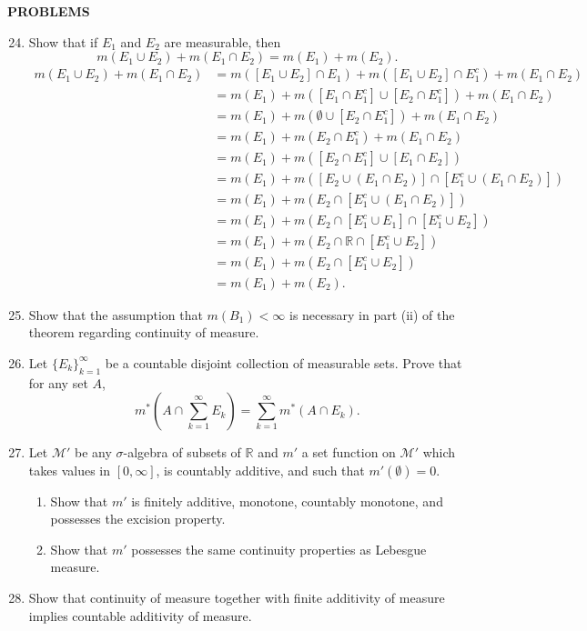 \begin{center}
	\textbf{PROBLEMS}
\end{center}
\begin{enumerate}
	\setcounter{enumi}{23}
	\item Show that if $E_1$ and $E_2$ are measurable, then
	\[
		m(E_1\cup E_2)+m(E_1\cap E_2) = m(E_1)+m(E_2).	
	\]
	\begin{align*}
		m(E_1\cup E_2)+m(E_1\cap E_2)&=m([E_1\cup E_2]\cap E_1)+m([E_1\cup E_2]\cap E_1^c)+m(E_1\cap E_2)\\
		&=m(E_1)+m([E_1\cap E_1^c]\cup[E_2\cap E_1^c])+m(E_1\cap E_2)\\
		&=m(E_1)+m(\emptyset\cup[E_2\cap E_1^c])+m(E_1\cap E_2)\\
		&=m(E_1)+m(E_2\cap E_1^c)+m(E_1\cap E_2)\\
		&=m(E_1)+m([E_2\cap E_1^c]\cup[E_1\cap E_2])\\
		&=m(E_1)+m([E_2\cup(E_1\cap E_2)]\cap [E_1^c\cup(E_1\cap E_2)])\\
		&=m(E_1)+m(E_2\cap [E_1^c\cup(E_1\cap E_2)])\\
		&=m(E_1)+m(E_2\cap [E_1^c\cup E_1]\cap [E_1^c\cup E_2])\\
		&=m(E_1)+m(E_2\cap \mathbb{R} \cap [E_1^c\cup E_2])\\
		&=m(E_1)+m(E_2\cap [E_1^c\cup E_2])\\
		&=m(E_1)+m(E_2).
	\end{align*}
	\item Show that the assumption that $m(B_1)<\infty$ is necessary in part (ii) of the theorem regarding continuity of measure.
	\item Let $\{E_k\}_{k=1}^\infty$ be a countable disjoint collection of measurable sets. Prove that for any set $A$, 
	\[
		m^*(A\cap\sum_{k=1}^\infty E_k)=\sum_{k=1}^\infty m^*(A\cap E_k).	
	\]
	\item Let $\mathcal{M}'$ be any $\sigma$-algebra of subsets of $\mathbb{R}$ and $m'$ a set function on $\mathcal{M}'$ which takes values in $[0,\infty]$, is countably additive, and such that $m'(\emptyset)=0$.
	\begin{enumerate}[label=(\roman*),align=left]
		\item Show that $m'$ is finitely additive, monotone, countably monotone, and possesses the excision property.
		\item Show that $m'$ possesses the same continuity properties as Lebesgue measure.
	\end{enumerate}
	\item Show that continuity of measure together with finite additivity of measure implies countable additivity of measure.
\end{enumerate}

